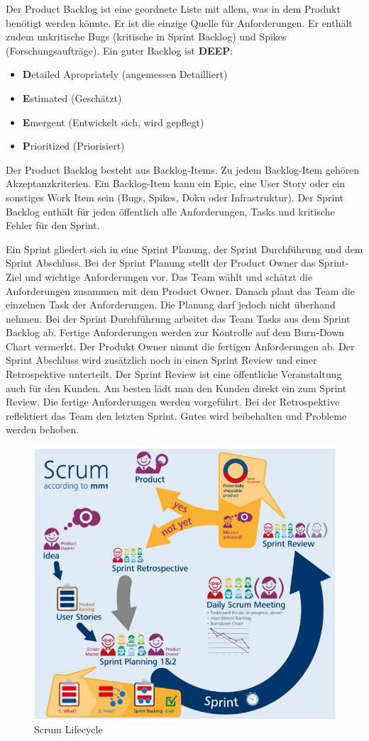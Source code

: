 Der Product Backlog ist eine geordnete Liste mit allem, was in dem Produkt benötigt werden könnte. Er ist die einzige Quelle für Anforderungen. Er enthält zudem unkritische Bugs (kritische in Sprint Backlog) und Spikes (Forschungsaufträge). Ein guter Backlog ist \textbf{DEEP}:
\begin{itemize}
	\item \textbf{D}etailed Apropriately (angemessen Detailliert)
	\item \textbf{E}stimated (Geschätzt)
	\item \textbf{E}mergent (Entwickelt sich, wird gepflegt)
	\item \textbf{P}rioritized (Priorisiert)
\end{itemize}
Der Product Backlog besteht aus Backlog-Items. Zu jedem Backlog-Item gehören Akzeptanzkriterien. Ein Backlog-Item kann ein Epic, eine User Story oder ein sonstiges Work Item sein (Bugs, Spikes, Doku oder Infrastruktur). Der Sprint Backlog enthält für jeden öffentlich alle Anforderungen, Tasks und kritische Fehler für den Sprint.

Ein Sprint gliedert sich in eine Sprint Planung, der Sprint Durchführung und dem Sprint Abschluss. 
Bei der Sprint Planung stellt der Product Owner das Sprint-Ziel und wichtige Anforderungen vor. Das Team wählt und schätzt die Anforderungen zusammen mit dem Product Owner. Danach plant das Team die einzelnen Task der Anforderungen. Die Planung darf jedoch nicht überhand nehmen.
Bei der Sprint Durchführung arbeitet das Team Tasks aus dem Sprint Backlog ab. Fertige Anforderungen werden zur Kontrolle auf dem Burn-Down Chart vermerkt. Der Produkt Owner nimmt die fertigen Anforderungen ab. 
Der Sprint Abschluss wird zusätzlich noch in einen Sprint Review und einer Retrospektive unterteilt. Der Sprint Review ist eine öffentliche Veranstaltung auch für den Kunden. Am besten lädt man den Kunden direkt ein zum Sprint Review. Die fertige Anforderungen werden vorgeführt. Bei der Retrospektive reflektiert das Team den letzten Sprint. Gutes wird beibehalten und Probleme werden behoben.

\begin{figure}
\centering
\includegraphics[width=0.7\linewidth]{fig/scrum-lifecycle}
\caption{Scrum Lifecycle}
\label{fig:scrum-lifecycle}
\end{figure}

